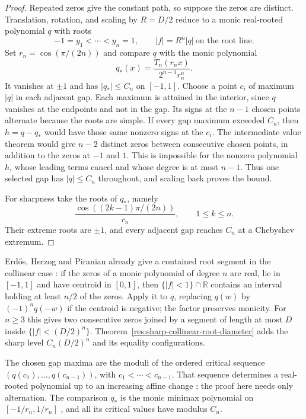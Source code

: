 \documentclass[11pt]{article}
\begin{document}
\begin{proof}
Repeated zeros give the constant path, so suppose the zeros are distinct.
Translation, rotation, and scaling by $R=D/2$ reduce to a monic real-rooted
polynomial $q$ with roots
\[
 -1=y_1<\cdots<y_n=1,
 \qquad |f|=R^n|q|\ \text{on the root line}.
\]
Set $r_n=\cos(\pi/(2n))$ and compare $q$ with the monic polynomial
\[
 q_*(x)=\frac{T_n(r_nx)}{2^{n-1}r_n^n}.
\]
It vanishes at $\pm1$ and has $|q_*|\le C_n$ on $[-1,1]$. Choose a point
$c_i$ of maximum $|q|$ in each adjacent gap. Each maximum is attained in
the interior, since $q$ vanishes at the endpoints and not in the gap.
Its signs at the $n-1$ chosen points alternate because the roots are simple.
If every gap maximum exceeded $C_n$, then $h=q-q_*$ would have those same
nonzero signs at the $c_i$. The intermediate value theorem would give
$n-2$ distinct zeros between consecutive chosen points, in addition to
the zeros at $-1$ and $1$. This is impossible for the nonzero polynomial
$h$, whose leading terms cancel and whose degree is at most $n-1$.  Thus one selected gap has
$|q|\le C_n$ throughout, and scaling back proves the bound.

For sharpness take the roots of $q_*$, namely
\[
 \frac{\cos((2k-1)\pi/(2n))}{r_n},\qquad 1\le k\le n.
\]
Their extreme roots are $\pm1$, and every adjacent gap reaches $C_n$ at a
Chebyshev extremum.
\end{proof}

Erd\H{o}s, Herzog and Piranian already give a contained root segment in the
collinear case \cite[Theorem~1, p.~126]{ehp1958}: if the zeros of a monic
polynomial of degree $n$ are real, lie in $[-1,1]$ and have centroid in
$[0,1]$, then $\{|f|<1\}\cap\mathbb R$ contains an interval holding at least
$n/2$ of the zeros. Apply it to $q$, replacing $q(w)$ by $(-1)^nq(-w)$
if the centroid is negative; the factor preserves monicity. For $n\ge3$
this gives two consecutive zeros joined by
a segment of length at most $D$ inside $\{|f|<(D/2)^n\}$.
Theorem~\ref{res:sharp-collinear-root-diameter} adds the sharp level
$C_n(D/2)^n$ and its equality configurations.

The chosen gap maxima are the moduli of the ordered critical sequence
$(q(c_1),\ldots,q(c_{n-1}))$, with $c_1<\cdots<c_{n-1}$.
That sequence determines a real-rooted polynomial up to an increasing
affine change \cite[Theorem~1]{eremenko-yuditskii}; the proof here needs
only alternation. The comparison $q_*$ is the monic minimax polynomial
on $[-1/r_n,1/r_n]$ \cite[\S1]{eremenko-yuditskii}, and all its critical
values have modulus $C_n$.
\end{document}
